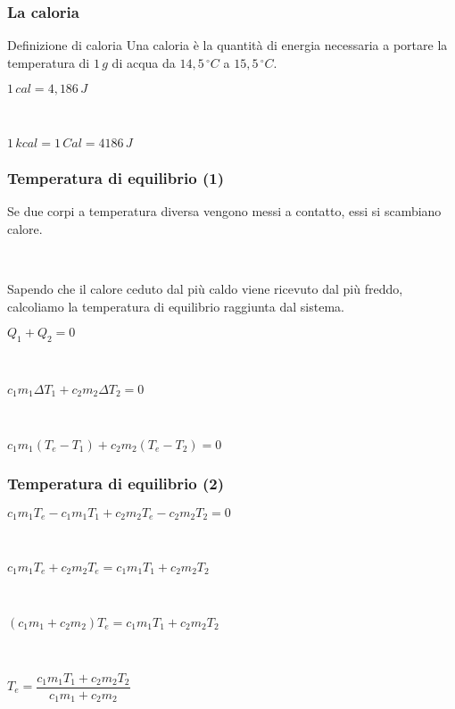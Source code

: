 \documentclass[]{beamer}
\theoremstyle{plain}
\begin{document}
\begin{frame}
\frametitle{La caloria}
\begin{block}{Definizione di caloria}
Una caloria è la quantità di energia necessaria a portare la temperatura di $ 1 \, g $ di acqua da $ 14,5 \, ^\circ C $ a $ 15,5 \, ^\circ C$.
\begin{center}
\colorbox{blue!30}{$ 1 \, cal = 4, 186 \, J $}\pause

~

$ 1 \, kcal = 1 \, Cal = 4186 \, J $
\end{center}
\end{block}
\end{frame}



\begin{frame}
\frametitle{Temperatura di equilibrio (1)}
Se due corpi a temperatura diversa vengono messi a contatto, essi si scambiano calore.\pause

~

Sapendo che \alert<2>{il calore ceduto dal più caldo viene ricevuto dal più freddo}, calcoliamo la temperatura di equilibrio raggiunta dal sistema.
\begin{center}
$ Q_1 + Q_2 = 0 $\pause

~

$ c_1 m_1 \Delta T_1 + c_2 m_2 \Delta T_2 = 0 $\pause

~

$ c_1 m_1 (T_e - T_1) + c_2 m_2 (T_e - T_2) = 0 $
\end{center}
\end{frame}



\begin{frame}
\frametitle{Temperatura di equilibrio (2)}
\begin{center}
$ c_1 m_1 T_e - c_1 m_1  T_1 + c_2 m_2 T_e - c_2 m_2 T_2 = 0 $\pause

~

$ c_1 m_1 T_e + c_2 m_2 T_e = c_1 m_1 T_1 + c_2 m_2 T_2 $\pause

~

$ (c_1 m_1 + c_2 m_2) T_e = c_1 m_1 T_1 + c_2 m_2 T_2 $\pause

~

\colorbox{blue!30}{$ T_e = \dfrac{c_1 m_1 T_1 + c_2 m_2 T_2}{c_1 m_1 + c_2 m_2} $}

\end{center}
\end{frame}
\end{document}
